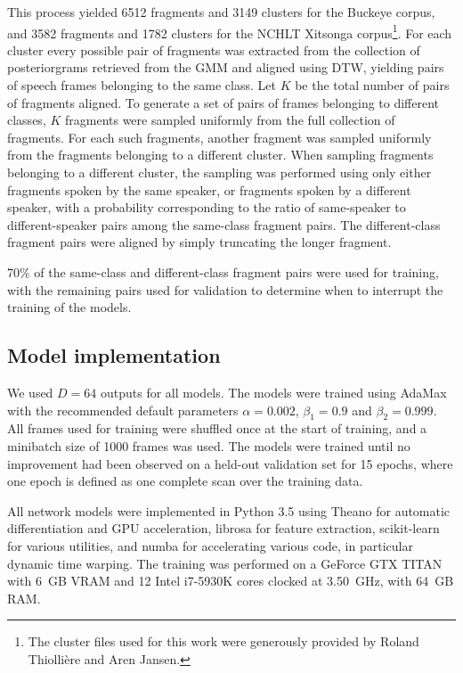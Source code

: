 This process yielded 6512 fragments and 3149 clusters for the Buckeye corpus, and 3582 fragments and 1782 clusters for the NCHLT Xitsonga corpus\footnote{The cluster files used for this work were generously provided by Roland Thiollière and Aren Jansen.}.
For each cluster every possible pair of fragments was extracted from the collection of posteriorgrams retrieved from the GMM and aligned using DTW, yielding pairs of speech frames belonging to the same class.
Let $K$ be the total number of pairs of fragments aligned.
To generate a set of pairs of frames belonging to different classes, $K$ fragments were sampled uniformly from the full collection of fragments.
For each such fragments, another fragment was sampled uniformly from the fragments belonging to a different cluster.
When sampling fragments belonging to a different cluster, the sampling was performed using only either fragments spoken by the same speaker, or fragments spoken by a different speaker, with a probability corresponding to the ratio of same-speaker to different-speaker pairs among the same-class fragment pairs.
The different-class fragment pairs were aligned by simply truncating the longer fragment.

70\% of the same-class and different-class fragment pairs were used for training, with the remaining pairs used for validation to determine when to interrupt the training of the models.

\subsection{Model implementation}

We used $D = 64$ outputs for all models.
The models were trained using AdaMax \parencite{kingma2014adam} with the recommended default parameters $\alpha = 0.002$, $\beta_1 = 0.9$ and $\beta_2 = 0.999$.
All frames used for training were shuffled once at the start of training, and a minibatch size of 1000 frames was used.
The models were trained until no improvement had been observed on a held-out validation set for 15 epochs, where one epoch is defined as one complete scan over the training data.

All network models were implemented in Python 3.5 using Theano \parencite{theano} for automatic differentiation and GPU acceleration, librosa \parencite{librosa} for feature extraction, scikit-learn \parencite{scikit-learn} for various utilities, and numba \parencite{numba} for accelerating various code, in particular dynamic time warping.
The training was performed on a GeForce GTX TITAN with 6~GB VRAM and 12 Intel i7-5930K cores clocked at 3.50~GHz, with 64~GB RAM.


